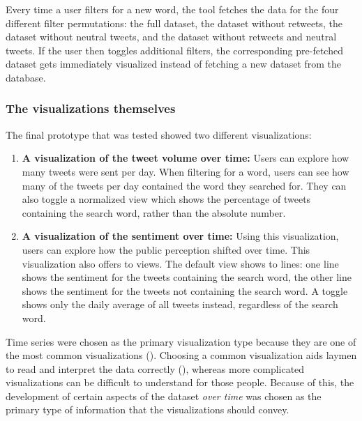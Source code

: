 Every time a user filters for a new word, the tool fetches the data for the four different filter permutations: the full dataset, the dataset without retweets, the dataset without neutral tweets, and the dataset without retweets and neutral tweets. If the user then toggles additional filters, the corresponding pre-fetched dataset gets immediately visualized instead of fetching a new dataset from the database.

\subsubsection{The visualizations themselves}
The final prototype that was tested showed two different visualizations:
\begin{enumerate}
    \item \textbf{A visualization of the tweet volume over time:} Users can explore how many tweets were sent per day. When filtering for a word, users can see how many of the tweets per day contained the word they searched for. They can also toggle a normalized view which shows the percentage of tweets containing the search word, rather than the absolute number.
    \item \textbf{A visualization of the sentiment over time:} Using this visualization, users can explore how the public perception shifted over time. This visualization also offers to views. The default view shows to lines: one line shows the sentiment for the tweets containing the search word, the other line shows the sentiment for the tweets not containing the search word. A toggle shows only the daily average of all tweets instead, regardless of the search word.
\end{enumerate}

Time series were chosen as the primary visualization type because they are one of the most common visualizations (\cite{heer2010}). Choosing a common visualization aids laymen to read and interpret the data correctly (\cite{borner2016}), whereas more complicated visualizations can be difficult to understand for those people. Because of this, the development of certain aspects of the dataset \emph{over time} was chosen as the primary type of information that the visualizations should convey.

